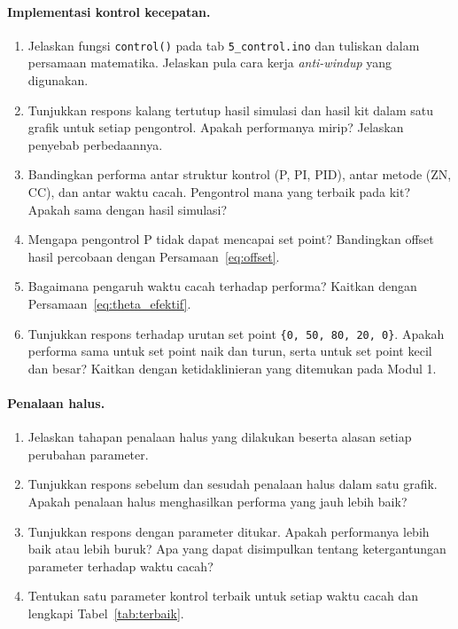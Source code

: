 \documentclass[11pt,a4paper]{article}
\newcommand{\prog}[1]{\texttt{#1}}
\begin{document}
\paragraph{Implementasi kontrol kecepatan.}
\begin{enumerate}[resume]
\item Jelaskan fungsi \texttt{control()} pada tab \prog{5\_control.ino} dan tuliskan dalam persamaan matematika. Jelaskan pula cara kerja \textit{anti-windup} yang digunakan.
\item Tunjukkan respons kalang tertutup hasil simulasi dan hasil kit dalam satu grafik untuk setiap pengontrol. Apakah performanya mirip? Jelaskan penyebab perbedaannya.
\item Bandingkan performa antar struktur kontrol (P, PI, PID), antar metode (ZN, CC), dan antar waktu cacah. Pengontrol mana yang terbaik pada kit? Apakah sama dengan hasil simulasi?
\item Mengapa pengontrol P tidak dapat mencapai set point? Bandingkan offset hasil percobaan dengan Persamaan~\eqref{eq:offset}.
\item Bagaimana pengaruh waktu cacah terhadap performa? Kaitkan dengan Persamaan~\eqref{eq:theta_efektif}.
\item Tunjukkan respons terhadap urutan set point \texttt{\{0, 50, 80, 20, 0\}}. Apakah performa sama untuk set point naik dan turun, serta untuk set point kecil dan besar? Kaitkan dengan ketidaklinieran yang ditemukan pada Modul 1.
\end{enumerate}

\paragraph{Penalaan halus.}
\begin{enumerate}[resume]
\item Jelaskan tahapan penalaan halus yang dilakukan beserta alasan setiap perubahan parameter.
\item Tunjukkan respons sebelum dan sesudah penalaan halus dalam satu grafik. Apakah penalaan halus menghasilkan performa yang jauh lebih baik?
\item Tunjukkan respons dengan parameter ditukar. Apakah performanya lebih baik atau lebih buruk? Apa yang dapat disimpulkan tentang ketergantungan parameter terhadap waktu cacah?
\item Tentukan satu parameter kontrol terbaik untuk setiap waktu cacah dan lengkapi Tabel~\ref{tab:terbaik}.
\end{enumerate}
\end{document}
